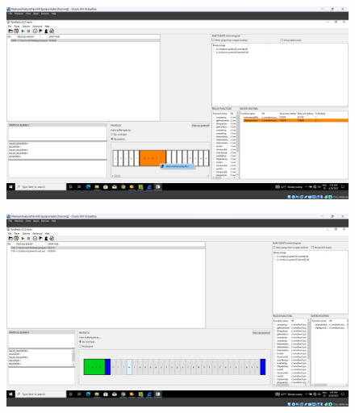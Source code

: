 \documentclass[conference]{IEEEtran}
\begin{document}
\begin{figure}
    \centerline{\includegraphics[width=\textwidth]{images/sch_s9.png}}
    \caption{}
    \label{figure:ap_sch_s9}
\end{figure}

\begin{figure}
    \centerline{\includegraphics[width=\textwidth]{images/sch_s10.png}}
    \caption{}
    \label{figure:ap_sch_s10}
\end{figure}
\end{document}
